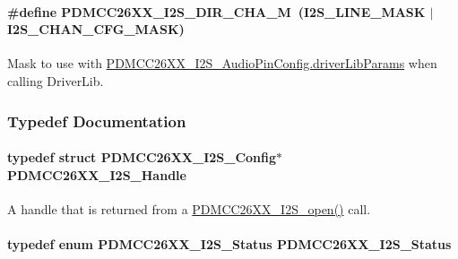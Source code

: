 \paragraph[{P\+D\+M\+C\+C26\+X\+X\+\_\+\+I2\+S\+\_\+\+D\+I\+R\+\_\+\+C\+H\+A\+\_\+\+M}]{\setlength{\rightskip}{0pt plus 5cm}\#define P\+D\+M\+C\+C26\+X\+X\+\_\+\+I2\+S\+\_\+\+D\+I\+R\+\_\+\+C\+H\+A\+\_\+\+M~(I2\+S\+\_\+\+L\+I\+N\+E\+\_\+\+M\+A\+S\+K $\vert$ I2\+S\+\_\+\+C\+H\+A\+N\+\_\+\+C\+F\+G\+\_\+\+M\+A\+S\+K)}\label{_p_d_m_c_c26_x_x__util_8h_a3105b54f425f7b4f8bdbef8cdab85432}
Mask to use with \hyperlink{union_p_d_m_c_c26_x_x___i2_s___audio_pin_config_a8af297ee464eea4533090185a5f39445}{P\+D\+M\+C\+C26\+X\+X\+\_\+\+I2\+S\+\_\+\+Audio\+Pin\+Config.\+driver\+Lib\+Params} when calling Driver\+Lib. 

\subsubsection{Typedef Documentation}
\paragraph[{P\+D\+M\+C\+C26\+X\+X\+\_\+\+I2\+S\+\_\+\+Handle}]{\setlength{\rightskip}{0pt plus 5cm}typedef struct {\bf P\+D\+M\+C\+C26\+X\+X\+\_\+\+I2\+S\+\_\+\+Config}$\ast$ {\bf P\+D\+M\+C\+C26\+X\+X\+\_\+\+I2\+S\+\_\+\+Handle}}\label{_p_d_m_c_c26_x_x__util_8h_adc3b274b4a54e54316ad385fd4290c80}


A handle that is returned from a \hyperlink{_p_d_m_c_c26_x_x__util_8h_a8168bcdab9f1e46c26823555df6f797f}{P\+D\+M\+C\+C26\+X\+X\+\_\+\+I2\+S\+\_\+open()} call. 

\paragraph[{P\+D\+M\+C\+C26\+X\+X\+\_\+\+I2\+S\+\_\+\+Status}]{\setlength{\rightskip}{0pt plus 5cm}typedef enum {\bf P\+D\+M\+C\+C26\+X\+X\+\_\+\+I2\+S\+\_\+\+Status}  {\bf P\+D\+M\+C\+C26\+X\+X\+\_\+\+I2\+S\+\_\+\+Status}}\label{_p_d_m_c_c26_x_x__util_8h_ad0f2102751f8a8f0bcd47dd154aa836c}


